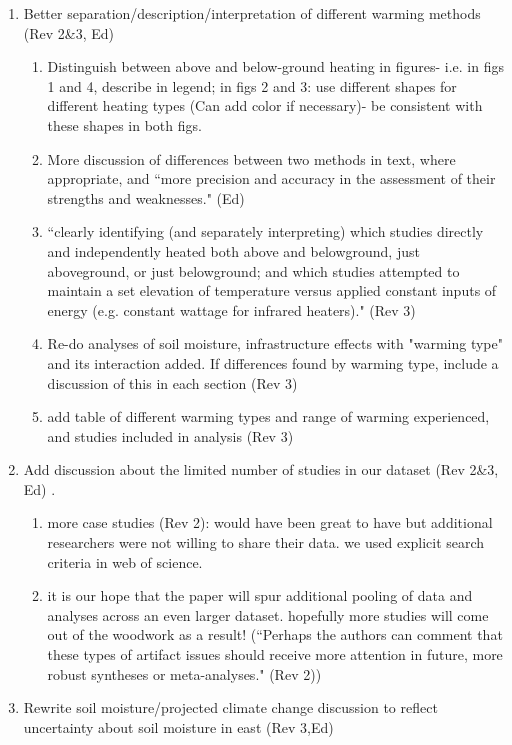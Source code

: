 \documentclass[12pt,a4paper]{article}
\begin{document}
\begin{enumerate}
\begin{enumerate}
\end{enumerate}
\item Better separation/description/interpretation of different warming methods (Rev 2\&3, Ed)
\begin{enumerate}
\item Distinguish between above and below-ground heating in figures- i.e. in figs 1 and 4, describe in legend; in figs 2 and 3:  use different shapes for different heating types (Can add color if necessary)- be consistent with these shapes in both figs. 
\item More discussion of differences between two methods in text, where appropriate, and ``more precision and accuracy in the assessment of their strengths and weaknesses." (Ed) 
\item ``clearly identifying (and separately interpreting) which studies directly and independently heated both above and belowground, just aboveground, or just belowground; and which studies attempted to maintain a set elevation of temperature versus applied constant inputs of energy (e.g. constant wattage for infrared heaters)." (Rev 3)
\item Re-do analyses of soil moisture, infrastructure effects with "warming type" and its interaction added. If differences found by warming type, include a discussion of this in each section (Rev 3)
\item add table of different warming types and range of warming experienced, and studies included in analysis (Rev 3)
\end{enumerate}
\item Add discussion about the limited number of studies in our dataset (Rev 2\&3, Ed) .
\begin{enumerate}
\item more case studies (Rev 2): would have been great to have but additional researchers were not willing to share their data. we used explicit search criteria in web of science. 
\item it is our hope that the paper will spur additional pooling of data and analyses across an even larger dataset.  hopefully more studies will come out of the woodwork as a result!
(``Perhaps the authors can comment that these types of artifact issues should receive more attention in future, more robust syntheses or meta-analyses." (Rev 2))
\end{enumerate}
\item Rewrite soil moisture/projected climate change discussion to reflect uncertainty about soil moisture in east (Rev 3,Ed)

\end{enumerate}
\end{document}
